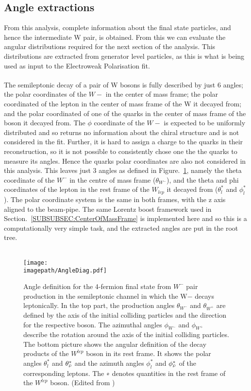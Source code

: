 \subsection{Angle extractions}
\label{SUBSEC:AngleExtractions}
From this analysis, complete information about the final state particles, and hence the intermediate W pair, is obtained. From this we can evaluate the angular distributions required for the next section of the analysis. This distributions are extracted from generator level particles, as this is what is being used as input to the Electroweak Polarisation fit.
\\\\
The semileptonic decay of a pair of W bosons is fully described by just 6 angles; the polar coordinates of the ${W}{-}$ in the center of mass frame; the polar coordinated of the lepton in the center of mass frame of the W it decayed from; and the polar coordinated of one of the quarks in the center of mass frame of the boson it decayed from. The $\phi$ coordinate of the ${W}{-}$ is expected to be uniformly distributed and so returns no information about the chiral structure and is not considered in the fit. Further, it is hard to assign a charge to the quarks in their reconstruction, so it is not possible to consistently chose one the the quarks to measure its angles. Hence the quarks polar coordinates are also not considered in this analysis. This leaves just 3 angles as defined in Figure.~\ref{FIG:Angles}, namely the theta coordinate of the ${W}^{-}$ in the centre of mass frame (${\theta}_{{W}^{-}}$), and the theta and phi coordinates of the lepton in the rest frame of the ${W}_{lep}$ it decayed from (${\theta}_{l}^{*}$ and ${\phi}_{l}^{*}$). The polar coordinate system is the same in both frames, with the z axis aligned to the beam-pipe. The same Lorentz boost framework used in Section.~\ref{SUBSUBSEC:CenterOfMassFrame} is implemented here and so this is a computationally very simple task, and the extracted angles are put in the root tree.
\\\\
\begin{figure}
    \texttt{[image: \\imagepath/AngleDiag.pdf]}
    \caption{
    Angle definition for the 4-fermion final state from ${W}^{-}$ pair production in the semileptonic channel in which the W− decays leptonically. In the top part, the production angles ${\theta}_{{W}^{-}}$ and ${\theta}_{{W}^{+}}$ are defined by the axis of the initial colliding particles and the direction for the respective boson. The azimuthal angles ${\phi}_{{W}^{-}}$ and ${\phi}_{{W}^{+}}$ describe the rotation around the axis of the initial colliding particles.\\
    The bottom picture shows the angular definition of the decay products of the ${W}^{lep}$ boson in its rest frame. It shows the polar angles ${\theta}_{l}^{*}$ and ${\theta}_{\bar{\nu}}^{*}$ and the azimuth angles ${\phi}_{l}^{*}$ and ${\phi}_{\bar{\nu}}^{*}$ of the corresponding leptons. The ∗ denotes quantities in the rest frame of the ${W}^{lep}$ boson. (Edited from \cite{Karl:424633})
      }
    \label{FIG:Angles}
\end{figure}

